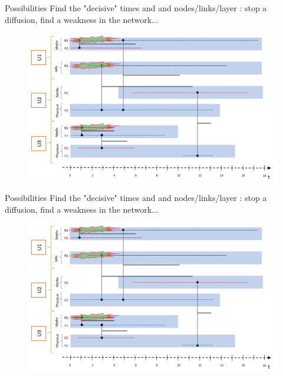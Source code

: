 \documentclass[15pt]{beamer}
\begin{document}
\begin{frame}{Possibilities}
Find the "decisive" times and and nodes/links/layer : stop a diffusion, find a weakness in the network...

\begin{figure}
	\centering
    \includegraphics[width=\linewidth]{img/epidemiet0.jpg}
    \label{fig:chercheurs}	
\end{figure}
\end{frame}
\begin{frame}{Possibilities}
Find the "decisive" times and and nodes/links/layer : stop a diffusion, find a weakness in the network...
\begin{figure}
	\centering
    \includegraphics[width=\linewidth]{img/epidemiet0.jpg}
    \label{fig:chercheurs}	
\end{figure}
\end{frame}
\end{document}
